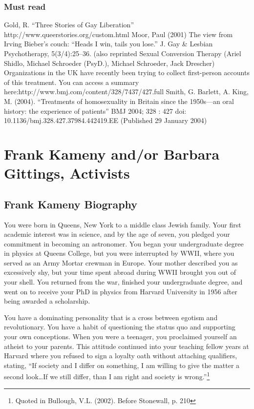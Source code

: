 \begin{refsection}
\subsection{Must read}
\label{mustread}

Gold, R. “Three Stories of Gay Liberation” http:\slash \slash www.queerstories.org\slash custom.html
Moor, Paul (2001) The view from Irving Bieber's couch: “Heads I win, tails you lose.” J. Gay \& Lesbian Psychotherapy, 5(3\slash 4):25--36. (also reprinted Sexual Conversion Therapy (Ariel Shidlo, Michael Schroeder (PsyD.), Michael Schroeder, Jack Drescher)
Organizations in the UK have recently been trying to collect first-person accounts of this treatment. You can access a summary here:http:\slash \slash www.bmj.com\slash content\slash 328\slash 7437\slash 427.full Smith, G. Barlett, A. King, M. (2004). “Treatments of homosexuality in Britain since the 1950s—an oral history: the experience of patients” BMJ 2004; 328 : 427 doi: 10.1136\slash bmj.328.427.37984.442419.EE (Published 29 January 2004)

\chapter{Frank Kameny and\slash or Barbara Gittings, Activists}
\label{frankkamenyandorbarbaragittingsactivists}

\section{Frank Kameny Biography}
\label{frankkamenybiography}

You were born in Queens, New York to a middle class Jewish family. Your first academic interest was in science, and by the age of seven, you pledged your commitment in becoming an astronomer. You began your undergraduate degree in physics at Queens College, but you were interrupted by WWII, where you served as an Army Mortar crewman in Europe. Your mother described you as excessively shy, but your time spent abroad during WWII brought you out of your shell. You returned from the war, finished your undergraduate degree, and went on to receive your PhD in physics from Harvard University in 1956 after being awarded a scholarship.

You have a dominating personality that is a cross between egotism and revolutionary. You have a habit of questioning the status quo and supporting your own conceptions. When you were a teenager, you proclaimed yourself an atheist to your parents. This attitude continued into your teaching fellow years at Harvard where you refused to sign a loyalty oath without attaching qualifiers, stating, “If society and I differ on something, I am willing to give the matter a second look…If we still differ, than I am right and society is wrong.”\footnote{Quoted in Bullough, V.L. (2002). Before Stonewall, p. 210}


\end{refsection}

